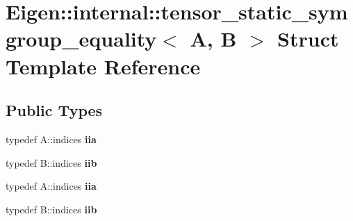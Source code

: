 \hypertarget{struct_eigen_1_1internal_1_1tensor__static__symgroup__equality}{}\section{Eigen\+:\+:internal\+:\+:tensor\+\_\+static\+\_\+symgroup\+\_\+equality$<$ A, B $>$ Struct Template Reference}
\label{struct_eigen_1_1internal_1_1tensor__static__symgroup__equality}
\subsection*{Public Types}
\begin{DoxyCompactItemize}
\item 
\mbox{\label{struct_eigen_1_1internal_1_1tensor__static__symgroup__equality_a34e1ebaec16f1aba30eafc03288d0416}} 
typedef A\+::indices {\bfseries iia}
\item 
\mbox{\label{struct_eigen_1_1internal_1_1tensor__static__symgroup__equality_a7d7fb150d283df23b19e4fc5374b07e4}} 
typedef B\+::indices {\bfseries iib}
\item 
\mbox{\label{struct_eigen_1_1internal_1_1tensor__static__symgroup__equality_a34e1ebaec16f1aba30eafc03288d0416}} 
typedef A\+::indices {\bfseries iia}
\item 
\mbox{\label{struct_eigen_1_1internal_1_1tensor__static__symgroup__equality_a7d7fb150d283df23b19e4fc5374b07e4}} 
typedef B\+::indices {\bfseries iib}
\end{DoxyCompactItemize}
